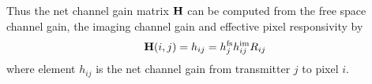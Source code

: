 Thus the net channel gain matrix $\bf{H}$ can be computed from the free space channel gain, the imaging channel gain and effective pixel responsivity by
\begin{equation}
	\label{eqMimoH}
	{\bf{H}}(i,j) = h_{ij} = h^{\text{fs}}_{j}h^{\text{im}}_{ij}R_{ij}
\end{equation}
where element $h_{ij}$ is the net channel gain from transmitter $j$ to pixel $i$.

